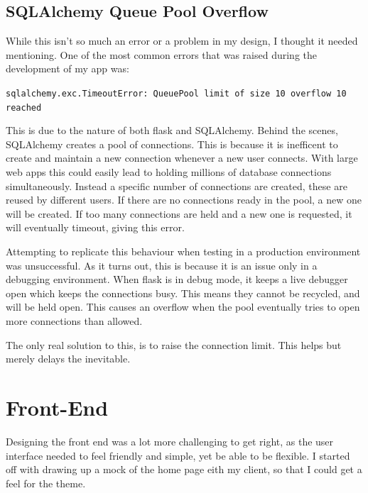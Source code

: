 \documentclass[a4paper,oneside,12pt]{report}
\begin{document}
	\subsection{SQLAlchemy Queue Pool Overflow}
	While this isn't so much an error or a problem in my design, I thought it needed mentioning. One of the most common errors that was raised during the development of my app was:
	\begin{framed}
		\lstinline|sqlalchemy.exc.TimeoutError: QueuePool limit of size 10 overflow 10 reached|
	\end{framed}
	This is due to the nature of both flask and SQLAlchemy. Behind the scenes, SQLAlchemy creates a pool of connections. This is because it is inefficent to create and maintain a new connection whenever a new user connects. With large web apps this could easily lead to holding millions of database connections simultaneously. Instead a specific number of connections are created, these are reused by different users. If there are no connections ready in the pool, a new one will be created. If too many connections are held and a new one is requested, it will eventually timeout, giving this error.

	Attempting to replicate this behaviour when testing in a production environment was unsuccessful. As it turns out, this is because it is an issue only in a debugging environment. When flask is in debug mode, it keeps a live debugger open which keeps the connections busy. This means they cannot be recycled, and will be held open. This causes an overflow when the pool eventually tries to open more connections than allowed.

	The only real solution to this, is to raise the connection limit. This helps but merely delays the inevitable.

	\section{Front-End}
	Designing the front end was a lot more challenging to get right, as the user interface needed to feel friendly and simple, yet be able to be flexible. I started off with drawing up a mock of the home page eith my client, so that I could get a feel for the theme.
\end{document}
